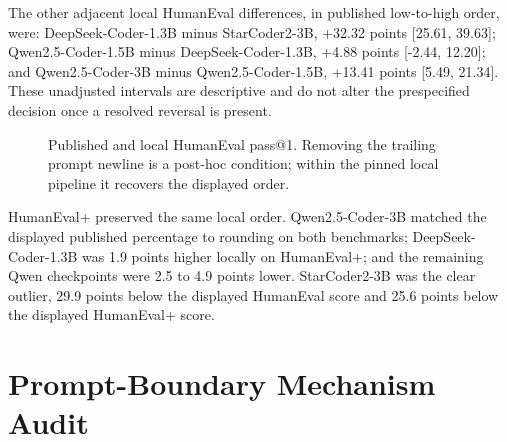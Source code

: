 \documentclass[10pt,twocolumn]{article}
\begin{document}
The other adjacent local HumanEval differences, in published low-to-high order, were: DeepSeek-Coder-1.3B minus StarCoder2-3B, +32.32 points [25.61, 39.63]; Qwen2.5-Coder-1.5B minus DeepSeek-Coder-1.3B, +4.88 points [-2.44, 12.20]; and Qwen2.5-Coder-3B minus Qwen2.5-Coder-1.5B, +13.41 points [5.49, 21.34]. These unadjusted intervals are descriptive and do not alter the prespecified decision once a resolved reversal is present.

\begin{figure}[t]
\centering
{}
\caption{Published and local HumanEval pass@1. Removing the trailing prompt newline is a post-hoc condition; within the pinned local pipeline it recovers the displayed order.}
\label{fig:results}
\end{figure}

HumanEval+ preserved the same local order. Qwen2.5-Coder-3B matched the displayed published percentage to rounding on both benchmarks; DeepSeek-Coder-1.3B was 1.9 points higher locally on HumanEval+; and the remaining Qwen checkpoints were 2.5 to 4.9 points lower. StarCoder2-3B was the clear outlier, 29.9 points below the displayed HumanEval score and 25.6 points below the displayed HumanEval+ score.

\section{Prompt-Boundary Mechanism Audit}
\label{sec:diagnostic}
\end{document}
